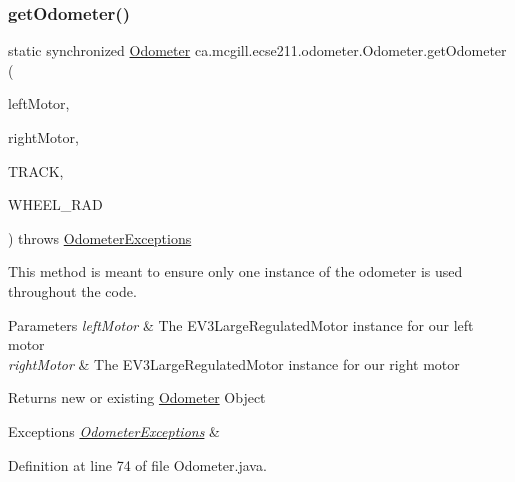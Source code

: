\subsubsection{\texorpdfstring{get\+Odometer()}{getOdometer()}\hspace{0.1cm}{\footnotesize\ttfamily [1/2]}}
{\footnotesize\ttfamily static synchronized \hyperlink{classca_1_1mcgill_1_1ecse211_1_1odometer_1_1_odometer}{Odometer} ca.\+mcgill.\+ecse211.\+odometer.\+Odometer.\+get\+Odometer (\begin{DoxyParamCaption}\item[{E\+V3\+Large\+Regulated\+Motor}]{left\+Motor,  }\item[{E\+V3\+Large\+Regulated\+Motor}]{right\+Motor,  }\item[{final double}]{T\+R\+A\+CK,  }\item[{final double}]{W\+H\+E\+E\+L\+\_\+\+R\+AD }\end{DoxyParamCaption}) throws \hyperlink{classca_1_1mcgill_1_1ecse211_1_1odometer_1_1_odometer_exceptions}{Odometer\+Exceptions}\hspace{0.3cm}{\ttfamily [static]}}

This method is meant to ensure only one instance of the odometer is used throughout the code.


\begin{DoxyParams}{Parameters}
{\em left\+Motor} & The E\+V3\+Large\+Regulated\+Motor instance for our left motor \\
\hline
{\em right\+Motor} & The E\+V3\+Large\+Regulated\+Motor instance for our right motor \\
\hline
\end{DoxyParams}
\begin{DoxyReturn}{Returns}
new or existing \hyperlink{classca_1_1mcgill_1_1ecse211_1_1odometer_1_1_odometer}{Odometer} Object 
\end{DoxyReturn}

\begin{DoxyExceptions}{Exceptions}
{\em \hyperlink{classca_1_1mcgill_1_1ecse211_1_1odometer_1_1_odometer_exceptions}{Odometer\+Exceptions}} & \\
\hline
\end{DoxyExceptions}


Definition at line 74 of file Odometer.\+java.

